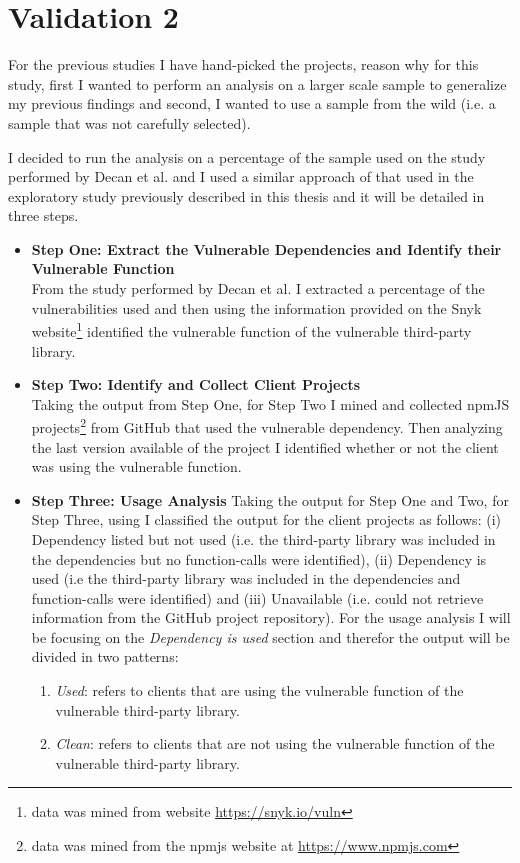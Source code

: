 \section{Validation 2}
For the previous studies I have hand-picked the projects, reason why for this study, first I wanted to perform an analysis on a larger scale sample to generalize my previous findings and second, I wanted to use a sample from the wild (i.e. a sample that was not carefully selected).  


I decided to run the analysis on a percentage of the sample used on the study performed by Decan et al. \cite{decan2018impact} and I used a similar approach of that used in the exploratory study previously described in this thesis and it will be detailed in three steps.
\begin{itemize}
    \item \textbf{Step One: Extract the Vulnerable Dependencies and Identify their Vulnerable Function}\\
    From the study performed by Decan et al. \cite{decan2018impact} I extracted a percentage of the vulnerabilities used and then using the information provided on the Snyk website\footnote{data was mined from website \url{https://snyk.io/vuln}} identified the vulnerable function of the vulnerable third-party library.
    
    \item \textbf{Step Two: Identify and Collect Client Projects} \\
    Taking the output from Step One, for Step Two I mined and collected npmJS projects\footnote{data was mined from the npmjs website at \url{https://www.npmjs.com}} from GitHub that used the vulnerable dependency. Then analyzing the last version available of the project I identified whether or not the client was using the vulnerable function.
    
    \item \textbf{Step Three: Usage Analysis}
    Taking the output for Step One and Two, for Step Three, using \tool[] I classified the output for the client projects as follows: (i) Dependency listed but not used (i.e. the third-party library was included in the dependencies but no function-calls were identified), (ii) Dependency is used (i.e the third-party library was included in the dependencies and function-calls were identified) and (iii) Unavailable (i.e. \tool[] could not retrieve information from the GitHub project repository). For the usage analysis I will be focusing on the \textit{Dependency is used} section and therefor the output will be divided in two patterns:
    \begin{enumerate}
        \item \textit{Used}: refers to clients that are using the vulnerable function of the vulnerable third-party library.
        \item \textit{Clean}: refers to clients that are not using the vulnerable function of the vulnerable third-party library.
    \end{enumerate}
\end{itemize}

